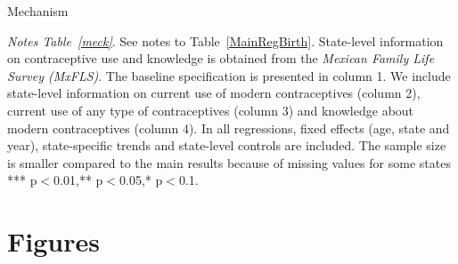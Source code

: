 \documentclass[a4paper, 11pt]{article}
\begin{document}
\begin{spacing}{2}
\begin{table}[H]\centering\caption{Mechanism}\label{meck}
\begin{threeparttable}\centering
\begin{subtable}{\textwidth}\centering{}\label{meckFertility}
{\footnotesize }
\end{subtable}
\begin{subtable}{\textwidth}\centering{}\label{meckMMR}
{\footnotesize  }
\end{subtable}
\begin{tablenotes}
\footnotesize
\item \textit{Notes Table~\ref*{meck}}. See notes to Table~\ref{MainRegBirth}. State-level information on contraceptive use and knowledge is obtained from the \textit{Mexican Family Life Survey (MxFLS)}. The baseline specification is presented in column 1. We include state-level information on current use of modern contraceptives (column 2), current use of any type of contraceptives (column 3) and knowledge about modern contraceptives (column 4). In all regressions, fixed effects (age, state and year), state-specific trends and state-level controls are included. The sample size is smaller compared to the main results because of missing values for some states *** p$<$0.01,** p$<$0.05,* p$<$0.1.
\end{tablenotes}
\end{threeparttable}
\end{table}
\restoregeometry


\clearpage
\section*{Figures}


\end{spacing}
\end{document}
